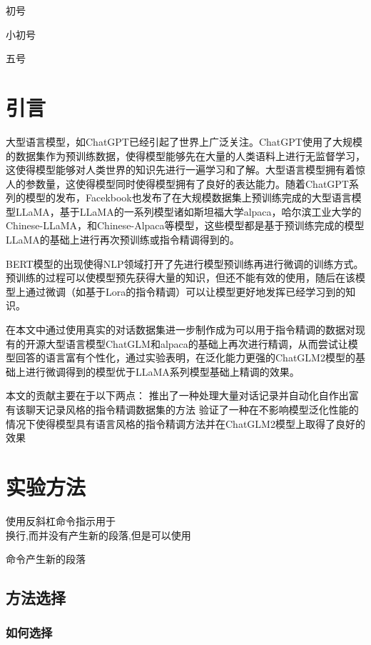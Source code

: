 \documentclass[8pt]{article}
\begin{document}
	 初号
	
	 小初号
	
	 五号
	
	\section{引言}
	大型语言模型，如ChatGPT已经引起了世界上广泛关注。ChatGPT使用了大规模的数据集作为预训练数据，使得模型能够先在大量的人类语料上进行无监督学习，这使得模型能够对人类世界的知识先进行一遍学习和了解。大型语言模型拥有着惊人的参数量，这使得模型同时使得模型拥有了良好的表达能力。随着ChatGPT系列的模型的发布，Facekbook也发布了在大规模数据集上预训练完成的大型语言模型LLaMA，基于LLaMA的一系列模型诸如斯坦福大学alpaca，哈尔滨工业大学的Chinese-LLaMA，和Chinese-Alpaca等模型，这些模型都是基于预训练完成的模型LLaMA的基础上进行再次预训练或指令精调得到的。
	
BERT模型的出现使得NLP领域打开了先进行模型预训练再进行微调的训练方式。预训练的过程可以使模型预先获得大量的知识，但还不能有效的使用，随后在该模型上通过微调（如基于Lora的指令精调）可以让模型更好地发挥已经学习到的知识。

在本文中通过使用真实的对话数据集进一步制作成为可以用于指令精调的数据对现有的开源大型语言模型ChatGLM和alpaca的基础上再次进行精调，从而尝试让模型回答的语言富有个性化，通过实验表明，在泛化能力更强的ChatGLM2模型的基础上进行微调得到的模型优于LLaMA系列模型基础上精调的效果。

本文的贡献主要在于以下两点：
推出了一种处理大量对话记录并自动化自作出富有该聊天记录风格的指令精调数据集的方法
验证了一种在不影响模型泛化性能的情况下使得模型具有语言风格的指令精调方法并在ChatGLM2模型上取得了良好的效果

	\section{实验方法}
	
	使用反斜杠命令指示用于\\换行,而并没有产生新的段落,但是可以使用 \par 命令产生新的段落
	
	\subsection{方法选择}
	
	\subsubsection{如何选择}
	
\end{document}
